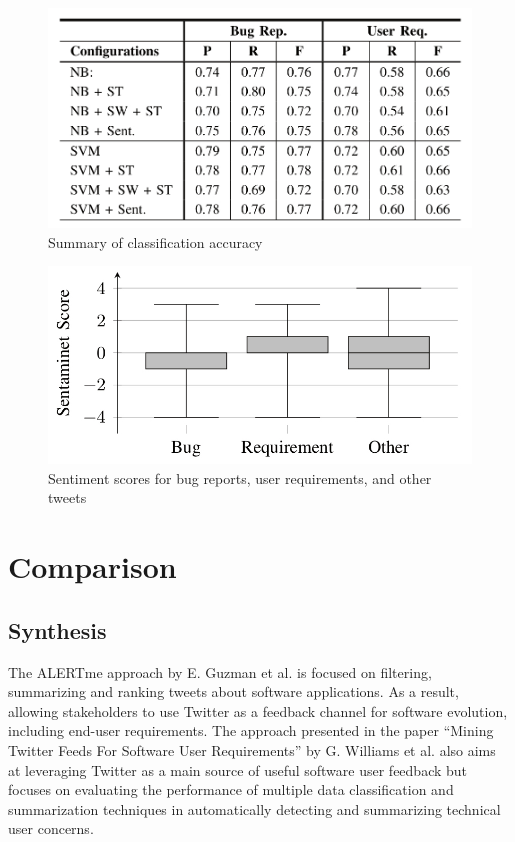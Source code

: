\documentclass[a4paper,10pt, bibliography=totocnumbered]{scrreprt}
\begin{document}
\begin{figure}
\centering
\includegraphics[scale=0.2]{images/Thema_5_approach_2_accuracy.jpeg}
\caption{Summary of classification accuracy}
\label{fig:Summary of classification accuracy}
\end{figure}

\begin{figure}
\centering
\includegraphics[scale=0.2]{images/Thema_5_approach_2_sentiment.jpeg}
\caption{Sentiment scores for bug reports, user requirements, and other tweets}
\label{fig:Summary of classification accuracy}
\end{figure}


\chapter{Comparison}

\section{Synthesis}
The ALERTme approach by E. Guzman et al. \cite{Guzman} is focused on filtering, summarizing and ranking tweets about software applications. As a result, allowing stakeholders to use Twitter as a feedback channel for software evolution, including end-user requirements. The approach presented in the paper “Mining Twitter Feeds For Software User Requirements” by G. Williams et al. \cite{Guzman} also aims at leveraging Twitter as a main source of useful software user feedback but focuses on evaluating the performance of multiple data classification and summarization techniques in automatically detecting and summarizing technical user concerns.
\end{document}
